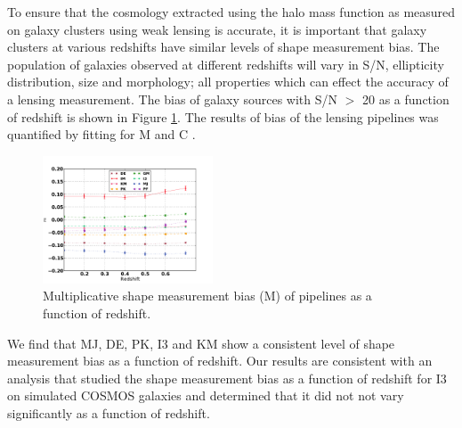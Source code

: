 To ensure that the cosmology extracted using the
halo mass function as measured on galaxy clusters
using weak lensing is accurate, it is important that
galaxy clusters at various redshifts have 
similar levels of shape measurement bias. The population of 
galaxies observed at different redshifts will vary in
S/N, ellipticity distribution, size and morphology;
all properties which can effect the accuracy of a lensing 
measurement. The bias of galaxy sources with S/N $>$ 
20 as a function of redshift is shown in Figure \ref{fig:red}.
The results of bias of the lensing pipelines was quantified 
by fitting for M and C . 

\begin{figure}
 \centering  %
  \includegraphics[width=0.45\textwidth]{fig/Mvalred_mfix.pdf} 
  \caption{Multiplicative shape measurement
  bias (M) of pipelines as a function of redshift.}
\label{fig:red}
\end{figure}
We find that MJ, DE, PK, I3 and KM
show a consistent level of shape measurement bias as a function of 
redshift. Our results are consistent with an analysis 
that studied the shape measurement bias as a function of redshift for I3 
\citep{K_2} on simulated COSMOS galaxies
and determined that it did not not vary significantly as a function
of redshift. 

